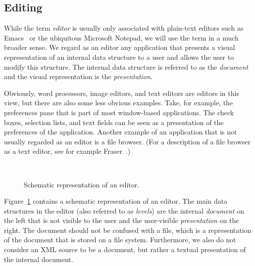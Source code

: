

\subsection{Editing}
\label{sect:editing}


While the term {\em editor} is usually only associated with plain-text editors such as Emacs~\cite{stallman81emacs} or the ubiquitous Microsoft Notepad, we will use the term in a much broader sense. We regard as an editor any application that presents a visual representation of an internal data structure to a user and allows the user to modify this structure. The internal data structure is referred to as the {\em document} and the visual representation is the {\em presentation}. 

Obviously, word processors, image editors, and text editors are editors in this view, but there are also some less obvious examples. Take, for example, the preferences pane that is part of most window-based applications. The check boxes, selection lists, and text fields can be seen as a presentation of the preferences of the application. Another example of an application that is not usually regarded as an editor is a file browser. (For a description of a file browser as a text editor, see for example Fraser~\cite{fraser80generalizedEditor}.)

\begin{figure}
\begin{small}
\begin{center}
\begin{center}
~\hspace{1.7cm}
\end{center}\caption{Schematic representation of an editor.}\label{editor} 
\end{center}
\end{small}
\end{figure}

\vspace*{-1.2ex} Figure~\ref{editor} contains a schematic representation of an editor. The main data structures in the editor (also referred to as {\em levels}) are the internal {\em document} on the left that is not visible to the user and the user-visible {\em presentation} on the right. The document should not be confused with a file, which is a representation of the document that is stored on a file system. Furthermore, we also do not consider an XML source to be a document, but rather a textual presentation of the internal document.

